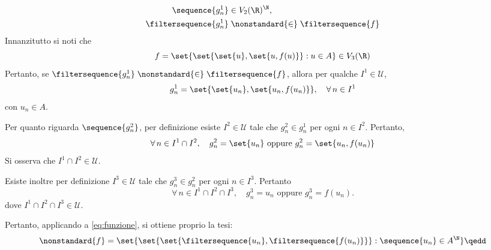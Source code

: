 {\begin{enumerate}
{\begin{align}
{\begin{aligned}
                    \sequence{g^{1}_n} &\in V_{2}(\R)^{\N},\\ \filtersequence{g^{1}_n}&\mathrel{\nonstandard{\in}}\filtersequence{f} 
                \end{aligned}
            }\label{eq:funzione}
        \end{align}}Innanzitutto si noti che \begin{equation*}
            f = \set{\set{\set{u},\set{u,f(u)}}: u \in A} \in V_3(\R)
        \end{equation*}Pertanto, se $ \filtersequence{g_{n}^{1}} \mathrel{\nonstandard{\in}} \filtersequence{f} $, allora per qualche $ I^{1} \in \mathcal{U} $, \begin{equation*}
            g_{n}^{1} =  \set{\set{u_{n} },\set{u_{n} ,f(u_{n} )}},\quad \forall\, n \in I^{1}
        \end{equation*}con $ u_{n} \in A  $.
        
        Per quanto riguarda $ \sequence{g_{n}^{2}} $, per definizione esiste $ I^{2} \in \mathcal{U} $ tale che $ g_{n}^{2} \in g_{n}^{1} $ per ogni $ n \in I^{2} $. Pertanto, \begin{equation*}
            \forall\, n \in I^{1}\cap I^{2},\quad g_{n}^{2} = \set{u_{n}}\text{ oppure }g_{n}^{2} = \set{u_{n}, f(u_{n} ) }  
        \end{equation*}Si osserva che $ I^{1}\cap I^{2} \in \mathcal{U} $.

        Esiste inoltre per definizione $ I^{3} \in \mathcal{U} $ tale che $ g_{n}^{3} \in g_{n}^{2} $ per ogni $ n \in I^{3} $. Pertanto \begin{equation*}
            \forall\, n \in I^{1}\cap I^{2}\cap I^{3},\quad g_{n}^{3} = u_{n}\text{ oppure }g_{n}^{3} = f(u_{n}).   
        \end{equation*}dove $ I^{1}\cap I^{2}\cap I^{3} \in \mathcal{U}$. 
        
        Pertanto, applicando a \eqref{eq:funzione}, si ottiene proprio la tesi: \begin{equation*}
            \nonstandard{f} = \set{
                \set{
                    \set{
                        \filtersequence{u_{n}}, \filtersequence{f(u_{n})}
                    }
                }: \sequence{u_{n}} \in A^\N 
            }\qedd
        \end{equation*}
    \end{enumerate}
}

